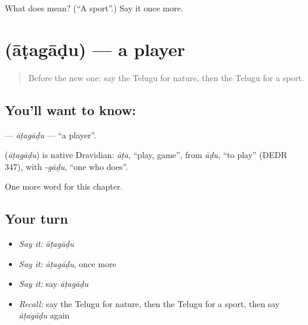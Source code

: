 \begin{tcolorbox}[breakable,colback=teal!4,colframe=teal!35!black,title={Before you move on}]
What does  mean? (\textquotedblleft{}A sport\textquotedblright{}.) Say it once more.
\end{tcolorbox}
\section[\texorpdfstring{\te{ఆటగాడు} (āṭagāḍu)}{ఆటగాడు (āṭagāḍu)}]{ (āṭagāḍu) — a player}

\label{lesson:TE-C304-atagadu}



\begin{quote}
Before the new one: say the Telugu for nature, then the Telugu for a sport.
\end{quote}

\subsection*{You'll want to know: }
\textbf{} — \emph{āṭagāḍu} — \textquotedblleft{}a player\textquotedblright{}.

\begin{cousinweb}
\textbf{} (\emph{āṭagāḍu}) is native Dravidian: \emph{āṭa}, \textquotedblleft{}play, game\textquotedblright{}, from \emph{āḍu}, \textquotedblleft{}to play\textquotedblright{} (DEDR 347), with \emph{-gāḍu}, \textquotedblleft{}one who does\textquotedblright{}.
\end{cousinweb}

\begin{grammarlens}[title={What you've built}]
One more word for this chapter.
\end{grammarlens}

\subsection*{Your turn}
\begin{itemize}
\raggedright
  \item \emph{Say it:} \emph{āṭagāḍu}
  \item \emph{Say it:} \emph{āṭagāḍu}, once more
  \item \emph{Say it:} say \emph{āṭagāḍu}
  \item \emph{Recall:} say the Telugu for nature, then the Telugu for a sport, then say \emph{āṭagāḍu} again
\end{itemize}

